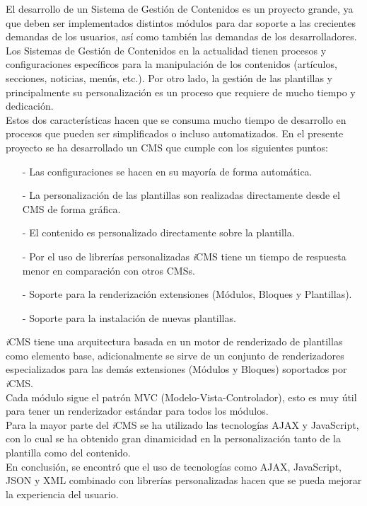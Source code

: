 El desarrollo de un Sistema de Gesti\'on de Contenidos es un proyecto grande, ya que deben ser implementados distintos m\'odulos para dar soporte a las crecientes demandas de los usuarios, as\'i como tambi\'en las demandas de los desarrolladores.\\
\newline
Los Sistemas de Gesti\'on de Contenidos en la actualidad tienen procesos y configuraciones espec\'ificos para la manipulaci\'on de los contenidos (art\'iculos, secciones, noticias, men\'us, etc.). Por otro lado, la 
gesti\'on de las plantillas y principalmente su personalizaci\'on es un proceso que requiere de mucho tiempo y dedicaci\'on.\\
\newline
Estos dos caracter\'isticas hacen que se consuma mucho tiempo de desarrollo en procesos que pueden ser simplificados o incluso automatizados. En el presente proyecto se ha desarrollado un CMS que cumple con los siguientes puntos:
\begin{itemize}
	\item[-] Las configuraciones se hacen en su mayor\'ia de forma autom\'atica.
	\item[-] La personalizaci\'on de las plantillas son realizadas directamente desde el CMS de forma gr\'afica.
	\item[-] El contenido es personalizado directamente sobre la plantilla.
	\item[-] Por el uso de librer\'ias personalizadas \textit{i}CMS tiene un tiempo de respuesta menor en comparaci\'on con otros CMSs.
	\item[-] Soporte para la renderizaci\'on extensiones (M\'odulos, Bloques y Plantillas).
	\item[-] Soporte para la instalaci\'on de nuevas plantillas.
\end{itemize}
\textit{i}CMS tiene una arquitectura basada en un motor de renderizado de plantillas como elemento base, adicionalmente se sirve de un conjunto de renderizadores especializados para las dem\'as extensiones (M\'odulos y Bloques) soportados por \textit{i}CMS.\\
\newline
Cada m\'odulo sigue el patr\'on MVC (Modelo-Vista-Controlador), esto es muy \'util para tener un renderizador est\'andar para todos los m\'odulos.\\
\newline
Para la mayor parte del \textit{i}CMS se ha utilizado las tecnolog\'ias AJAX y JavaScript, con lo cual se ha obtenido gran dinamicidad en la personalizaci\'on tanto de la plantilla como del contenido.\\
\newline
En conclusi\'on, se encontr\'o  que el uso de tecnolog\'ias como AJAX, JavaScript, JSON y XML combinado con librer\'ias personalizadas hacen que se pueda mejorar la experiencia del usuario.\\

\clearpage
